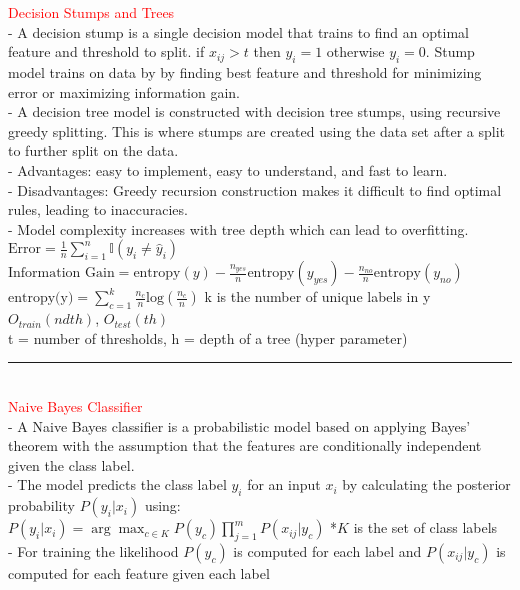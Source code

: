 \documentclass[8pt]{extarticle}
\begin{document}
\begin{multicols*}{2}
\pagestyle{empty}
\textcolor{red}{Decision Stumps and Trees}
\\
- A decision stump is a single decision model that trains to find an optimal feature and threshold to split. if $x_{ij} > t$ then $y_i = 1$ otherwise $y_i = 0$. Stump model trains on data by by finding best feature and threshold for minimizing error or maximizing information gain.
\\
- A decision tree model is constructed with decision tree stumps, using recursive greedy splitting. This is where stumps are created using the data set after a split to further split on the data.
\\
- Advantages: easy to implement, easy to understand, and fast to learn.
\\
- Disadvantages: Greedy recursion construction makes it difficult to find optimal rules, leading to inaccuracies.
\\
- Model complexity increases with tree depth which can lead to overfitting.
\\
$\text{Error} = \frac{1}{n}\sum_{i=1}^{n} \mathbb{I}(y_i \neq \hat{y}_i)$
\\
$\text{Information Gain} = \text{entropy}(y) - \frac{n_{yes}}{n} \text{entropy}(y_{yes}) - \frac{n_{no}}{n} \text{entropy}(y_{no})$
\\
$\text{entropy(y)} = \sum_{c=1}^{k}\frac{n_{c}}{n}\text{log}(\frac{n_{c}}{n})$ k is the number of unique labels in y
\\
$O_{train}(ndth)$, $O_{test}(th)$
\\
t = number of thresholds, h = depth of a tree (hyper parameter)
\\
\rule{\linewidth}{0.5mm} 
\\
\textcolor{red}{Naive Bayes Classifier}
\\
- A Naive Bayes classifier is a probabilistic model based on applying Bayes' theorem with the assumption that the features are conditionally independent given the class label.
\\
- The model predicts the class label $y_i$ for an input $x_i$ by calculating the posterior probability $P(y_i | x_i)$ using:
\\
$P(y_i | x_i) = \arg\max_{c \in K}P(y_{c})\prod_{j=1}^{m} P(x_{ij} | y_c)$
*$K$ is the set of class labels
\\
- For training the likelihood $P(y_c)$ is computed for each label and $P(x_{ij} | y_c)$ is computed for each feature given each label
\\

\end{multicols*}
\end{document}
